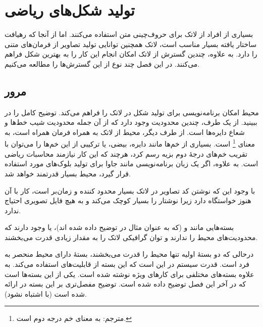 \chapter{تولید شکل‌های ریاضی}
\label{chap:graphics}

\begin{intro}
بسیاری از افراد از لاتک برای حروف‌چینی متن استفاده می‌کنند. اما از آنجا که رهیافت ساختار یافته بسیار مناسب است، لاتک همچنین توانایی تولید تصاویر از فرمان‌های متنی را دارد. به علاوه، چندین گسترش از لاتک امکان انجام این کار را به بهترین شکل فراهم می‌کنند. در این فصل چند نوع از این گسترش‌ها را مطالعه می‌کنیم.

\end{intro}


\section{مرور}
محیط  امکان برنامه‌نویسی برای تولید شکل در لاتک را فراهم می‌کند. توضیح کامل را در  
\manual ببینید. از یک طرف، چندین محدودیت وجود دارد که از آن جمله محدودیت شیب خط‌ها و شعاع دایره‌ها است. از طرف دیگر، محیط  از لاتک به همراه فرمان  همراه است،  به معنای 
\footnote{مترجم: به معنای خم درجه دوم است.}
 است.  بسیاری از خم‌ها مانند دایره‌، بیضی،  یا ترکیبی از این خم‌ها را می‌توان با تقریب خم‌های درجهٔ دوم بزیه رسم کرد، هرچند که این کار نیازمند محاسبات ریاضی است. به علاوه، اگر یک زبان برنامه‌نویسی مانند جاوا برای تولید بلوک‌های  مورد استفاده قرار گیرد، محیط   بسیار قدرتمند خواهد شد.

با  وجود این که نوشتن کد تصاویر در لاتک بسیار محدود کننده و زمان‌بر است، کار با آن هنوز خواستگاه دارد زیرا نوشتار‌‌ را بسیار کوچک می‌کند و به هیچ فایل تصویری احتیاج ندارد.

بسته‌هایی مانند   و  (که به عنوان مثال در 
\companion توضیح داده شده اند)، 
یا  وجود دارند که محدودیت‌های محیط  را ندارند و توان گرافیکی لاتک را به مقدار زیادی قدرت می‌بخشند.

درحالی که دو بستهٔ اولیه تنها محیط  را قدرت می‌بخشند، بستهٔ 
دارای محیط منحصر به فرد  است. قدرت سیستم  در این است که این بسته از قابلیت‌های \PSi استفاده می‌کند. به علاوه بسته‌های مختلفی برای کارهای ویژه نوشته شده است. یکی از این بسته‌ها  است که در آخر این فصل توضیح داده شده است. توضیح مفصل‌تری بر این بسته در  
\graphicscompanion   ارائه شده است 
(با 
\companion اشتباه نشود).

